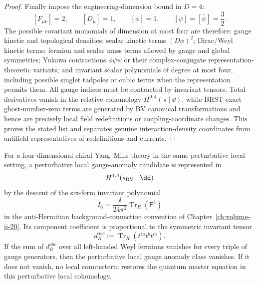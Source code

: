 \begin{proof}
Finally impose the engineering-dimension bound in \(D=4\):
\[
  [F_{\mu\nu}]=2,\qquad [D_\mu]=1,\qquad
  [\phi]=1,\qquad [\psi]=[\bar\psi]=\frac32 .
\]
The possible covariant monomials of dimension at most four are therefore:
gauge kinetic and topological densities; scalar kinetic terms
\((D\phi)^2\); Dirac/Weyl kinetic terms; fermion and scalar mass terms allowed
by gauge and global symmetries; Yukawa contractions \(\phi\psi\psi\) or their
complex-conjugate representation-theoretic variants; and invariant scalar
polynomials of degree at most four, including possible singlet tadpoles or
cubic terms when the representation permits them.  All gauge indices must be
contracted by invariant tensors.  Total derivatives vanish in the relative
cohomology \(H^{0,4}(s\mid\dd)\), while BRST-exact ghost-number-zero terms are
generated by BV canonical transformations and hence are precisely local field
redefinitions or coupling-coordinate changes.  This proves the stated list
and separates genuine interaction-density coordinates from antifield
representatives of redefinitions and currents.
\end{proof}

\begin{proposition}
\label{prop:bv-ghost-one-anomaly-calculation}
For a four-dimensional chiral Yang--Mills theory in the same perturbative
local setting, a perturbative local gauge-anomaly candidate is represented in
\[
  H^{1,4}(s_{\rm BV}\mid\dd)
\]
by the descent of the six-form invariant polynomial
\[
  I_6
  =
  \frac{\ii}{24\pi^2}
  \operatorname{Tr}_R(\mathsf F^3)
\]
in the anti-Hermitian background-connection convention of
Chapter~\ref{ch:volume-ii-20}.  Its component coefficient is proportional to
the symmetric invariant tensor
\[
  d_R^{abc}:=\operatorname{Tr}_R(t^{(a}t^bt^{c)}).
\]
If the sum of \(d_R^{abc}\) over all left-handed Weyl fermions vanishes for
every triple of gauge generators, then the perturbative local gauge anomaly
class vanishes.  If it does not vanish, no local counterterm restores the
quantum master equation in this perturbative local cohomology.
\end{proposition}


